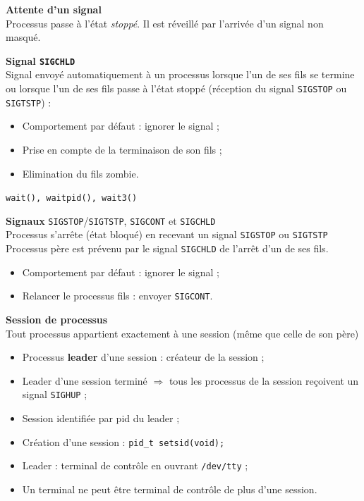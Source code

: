 \documentclass[french]{scrartcl}
\begin{document}
\begin{multicols}{3}
\vskip 5pt
\textbf{Attente d'un signal}\\
Processus passe à l’état \emph{stoppé}. Il est réveillé par l’arrivée d’un signal non masqué.\\

\vskip 5pt
\textbf{Signal \lstinline!SIGCHLD!}\\
Signal envoyé automatiquement à un processus lorsque l'un de ses fils se termine ou lorsque l'un de ses fils passe à l'état stoppé (réception du signal \lstinline!SIGSTOP! ou \lstinline!SIGTSTP!) :\begin{itemize}
	\item Comportement par défaut : ignorer le signal ;
	\item Prise en compte de la terminaison de son fils ;
	\item Elimination du fils zombie.
\end{itemize}
\lstinline!wait(), waitpid(), wait3()!

\vskip 5pt
\textbf{Signaux} \lstinline!SIGSTOP!/\lstinline!SIGTSTP!, \lstinline!SIGCONT! et \lstinline!SIGCHLD!\\
Processus s'arrête (état bloqué) en recevant un signal \lstinline!SIGSTOP! ou \lstinline!SIGTSTP!\\
Processus père est prévenu par le signal \lstinline!SIGCHLD! de l'arrêt d'un de ses fils.\begin{itemize}
	\item Comportement par défaut : ignorer le signal ;
	\item Relancer le processus fils : envoyer \lstinline!SIGCONT!.
\end{itemize}

\vskip 5pt
\textbf{Session de processus}\\
Tout processus appartient exactement à une session (même que celle de son père) \begin{itemize}
	\item Processus \textbf{leader} d'une session : créateur de la session ;
	\item Leader d'une session terminé $\Rightarrow$ tous les processus de la session reçoivent un signal \lstinline!SIGHUP! ;
	\item Session identifiée par pid du leader ;
	\item Création d'une session : \lstinline!pid_t setsid(void);!
	\item Leader : terminal de contrôle en ouvrant \lstinline!/dev/tty! ;
	\item Un terminal ne peut être terminal de contrôle de plus d'une session.
\end{itemize}


\end{multicols}
\end{document}

